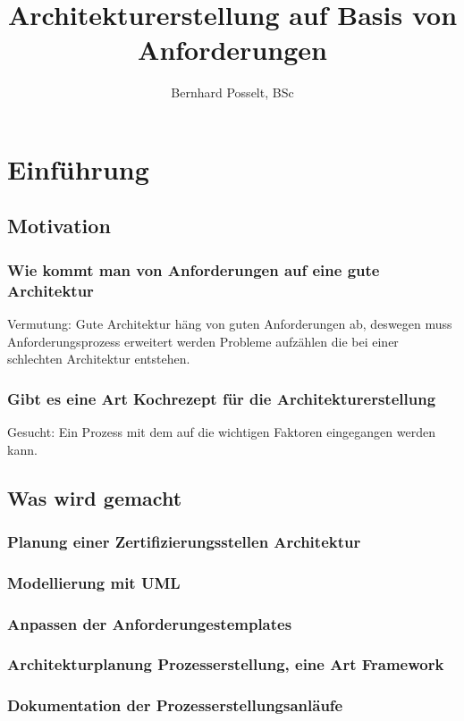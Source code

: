 \documentclass[Master,MSE,german]{twbook}
\title{Architekturerstellung auf Basis von Anforderungen}
\author{Bernhard Posselt, BSc}
\begin{document}
\maketitle

%
%

\chapter{Einführung}

\section{Motivation}
\subsection{Wie kommt man von Anforderungen auf eine gute Architektur}
Vermutung: Gute Architektur häng von guten Anforderungen ab, deswegen muss Anforderungsprozess erweitert werden
Probleme aufzählen die bei einer schlechten Architektur entstehen.

\subsection{Gibt es eine Art Kochrezept für die Architekturerstellung}
Gesucht: Ein Prozess mit dem auf die wichtigen Faktoren eingegangen werden kann.

\section{Was wird gemacht}
\subsection{Planung einer Zertifizierungsstellen Architektur}
\subsection{Modellierung mit UML}
\subsection{Anpassen der Anforderungestemplates}
\subsection{Architekturplanung Prozesserstellung, eine Art Framework}
\subsection{Dokumentation der Prozesserstellungsanläufe}
\end{document}
